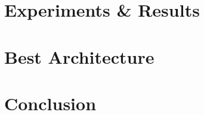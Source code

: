 \documentclass[12pt,twoside]{book}
\begin{document}
\chapter{Experiments \& Results} \label{ch:experiments and results}


\chapter{Best Architecture} \label{ch:best algorithm}


\chapter{Conclusion} \label{ch:conclusion}


%


\end{document}
